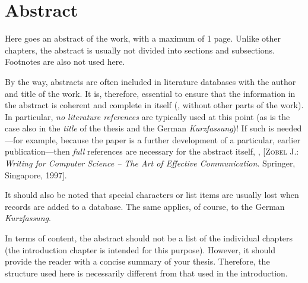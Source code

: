 \chapter{Abstract}

Here goes an abstract of the work, with a maximum of 1 page. Unlike other
chapters, the abstract is usually not divided into sections and subsections.
Footnotes are also not used here.

By the way, abstracts are often included in literature databases with the author
and title of the work. It is, therefore, essential to ensure that the
information in the abstract is coherent and complete in itself (\ie, without
other parts of the work). In particular, \emph{no literature references} are
typically used at this point (as is the case also in the \emph{title} of the
thesis and the German \emph{Kurzfassung})!
If such is needed---for example, because the paper is a further development of a
particular, earlier publication---then \emph{full} references are necessary for the
abstract itself, \eg, [\textsc{Zobel} J.: \textit{Writing for Computer Science
-- The Art of Effective Commu\-nica\-tion}. Springer, Singapore, 1997].

It should also be noted that special characters or list items are usually lost
when records are added to a database. The same applies, of course, to the German
\emph{Kurzfassung}.

In terms of content, the abstract should not be a list of the individual
chapters (the introduction chapter is intended for this purpose). However, it
should provide the reader with a concise summary of your thesis.
Therefore, the structure used here is necessarily different from that used in
the introduction.
